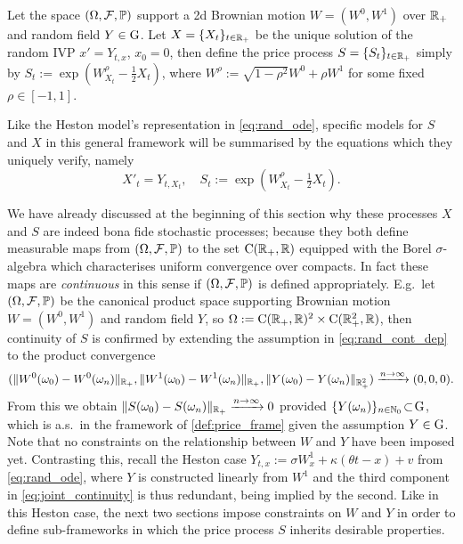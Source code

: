 \begin{definition}\label{def:price_frame}
    Let the space $(\Omega, \mathcal{F},\mathbb{P})$ support a 2d Brownian motion $W=(W^0,W^1)$ over $\mathbb{R}_+$ and random field $Y\in\mathrm{G}$. Let $X=\{X_t\}_{t\in\mathbb{R}_+}$ be the unique solution of the random IVP $x'=Y_{t,x}$, $x_0=0$, then define the price process $S=\{S_t\}_{t\in\mathbb{R}_+}$ simply by $S_t:=\exp(W^\rho_{X_t}-\frac12 X_t)$, where $W^\rho:=\sqrt{1-\rho^2}W^0 + \rho W^1$ for some fixed $\rho\in[-1,1]$.
\end{definition}

Like the Heston model's representation in \autoref{eq:rand_ode}, specific models for $S$ and $X$ in this general framework will be summarised by the equations which they uniquely verify, namely
\begin{equation}
    X'_t = Y_{t,X_t},\quad S_t:=\exp(W^\rho_{X_t}-\tfrac12 X_t).
\end{equation}

We have already discussed at the beginning of this section why these processes $X$ and $S$ are indeed bona fide stochastic processes; because they both define measurable maps from $(\Omega, \mathcal{F},\mathbb{P})$ to the set $\mathrm{C}(\mathbb{R}_+,\mathbb{R})$ equipped with the Borel $\sigma$-algebra which characterises uniform convergence over compacts. In fact these maps are \emph{continuous} in this sense if $(\Omega, \mathcal{F},\mathbb{P})$ is defined appropriately. E.g.~let $(\Omega, \mathcal{F},\mathbb{P})$ be the canonical product space supporting Brownian motion $W=(W^0,W^1)$ and random field $Y$, so $\Omega:=\mathrm{C}(\mathbb{R}_+,\mathbb{R})^2\times\mathrm{C}(\mathbb{R}_+^2,\mathbb{R})$, then continuity of $S$ is confirmed by extending the assumption in \autoref{eq:rand_cont_dep} to the product convergence
\begin{multline}\label{eq:joint_continuity}
    (\Vert W^0(\omega_0) - W^0(\omega_n)\Vert_{\mathbb{R}_+} , \Vert W^1(\omega_0) - W^1(\omega_n)\Vert_{\mathbb{R}_+}, \Vert Y(\omega_0) - Y(\omega_n)\Vert_{\mathbb{R}^2_+}) \xrightarrow{n\to\infty} (0,0,0).
\end{multline}
From this we obtain $\Vert S(\omega_0) - S(\omega_n) \Vert_{\mathbb{R}_+}\xrightarrow{n\to\infty}0$ provided $\{Y(\omega_n)\}_{n\in\mathbb{N}_0}\!\subset\!\mathrm{G}$, which is a.s.~in the framework of \autoref{def:price_frame} given the assumption $Y\in\mathrm{G}$. Note that no constraints on the relationship between $W$ and $Y$ have been imposed yet. Contrasting this, recall the Heston case $Y_{t,x}:=\sigma W^1_x + \kappa(\theta t - x) + v$ from \autoref{eq:rand_ode}, where $Y$ is constructed linearly from $W^1$ and the third component in \autoref{eq:joint_continuity} is thus redundant, being implied by the second. Like in this Heston case, the next two sections impose constraints on $W$ and $Y$ in order to define sub-frameworks in which the price process $S$ inherits desirable properties.

